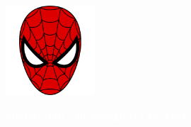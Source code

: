 \documentclass[12pt]{article}
\begin{document}
\newpage
{}
\begin{center}
    \vspace*{2cm}
    \includegraphics[width=0.25\textwidth]{spiderman.png}
    \vspace{0.5cm}

    {\Huge \textbf{\textcolor{white}{Spider-Man Chronological Checklist}}}
\end{center}

\vspace{0.5cm}
\end{document}
